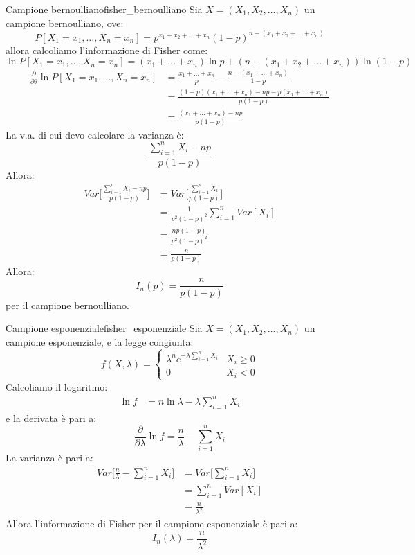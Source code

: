 \documentclass[12pt]{report}
\newcommand{\nmu}{}
\begin{document}
	\begin{example}{\nmu Campione bernoulliano}{fisher_bernoulliano}
		Sia $X = (X_1, X_2, \dots, X_n)$ un campione bernoulliano, ove:
		\[
		P[X_1 = x_1, \dots, X_n = x_n] = p^{x_1 + x_2 + \dots + x_n}(1-p)^{n-(x_1 + x_2 + \dots + x_n)}
		\]
		allora calcoliamo l'informazione di Fisher come:
		\[
		\ln P[X_1 = x_1, \dots, X_n = x_n] = (x_1 + \dots + x_n)\ln p + (n - (x_1 + x_2 + \dots + x_n))\ln(1-p)
		\]
		\begin{align*}
		\frac{\partial}{\partial \theta}\ln P[X_1 = x_1, \dots, X_n = x_n] &= \frac{x_1 + \dots + x_n}{p} - \frac{n - (x_1 + \dots + x_n)}{1-p} \\
		&= \frac{(1-p)(x_1 + \dots + x_n) - np - p(x_1 + \dots + x_n)}{p(1-p)} \\
		&= \frac{(x_1 + \dots + x_n) - np}{p(1-p)}
		\end{align*}
		La v.a. di cui devo calcolare la varianza è:
		\[
		\frac{\sum_{i=1}^{n}X_i - np}{p(1-p)}
		\]
		Allora:
		\begin{align*}
			Var\Bigg[\frac{\sum_{i=1}^{n}X_i - np}{p(1-p)}\Bigg] &= Var\Bigg[\frac{\sum_{i=1}^{n}X_i}{p(1-p)}\Bigg] \\
			&= \frac{1}{p^2(1-p)^2}\sum_{i=1}^{n}Var[X_i] \\
			&= \frac{np(1-p)}{p^2(1-p)^2} \\
			&= \frac{n}{p(1-p)}
		\end{align*}
		Allora:
		\[
		I_n(p) = \frac{n}{p(1-p)}
		\]
		per il campione bernoulliano.
	\end{example}
	\begin{example}{\nmu Campione esponenziale}{fisher_esponenziale}
		Sia $X = (X_1, X_2, \dots, X_n)$ un campione esponenziale, e la legge congiunta:
		\[
		f(X, \lambda) = \begin{cases}
			\lambda^ne^{-\lambda\sum_{i=1}^{n}X_i} & X_i \geq 0 \\
			0 & X_i < 0
		\end{cases}
		\]
		Calcoliamo il logaritmo:
		\begin{align*}
			\ln f &= n\ln\lambda - \lambda \sum_{i=1}^{n}X_i
		\end{align*}
		e la derivata è pari a:
		\[
		\frac{\partial}{\partial \lambda}\ln f = \frac{n}{\lambda} - \sum_{i=1}^{n}X_i
		\]
		La varianza è pari a:
		\begin{align*}
			Var\Bigg[\frac{n}{\lambda} - \sum_{i=1}^{n}X_i\Bigg] &= Var\Bigg[\sum_{i=1}^{n}X_i\Bigg] \\
			&= \sum_{i=1}^{n}Var[X_i] \\
			&= \frac{n}{\lambda^2}
		\end{align*}
		Allora l'informazione di Fisher per il campione esponenziale è pari a:
		\[
		I_n(\lambda) = \frac{n}{\lambda^2}
		\]
	\end{example}
\end{document}
